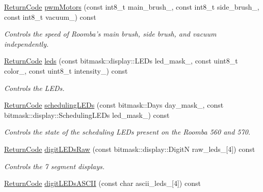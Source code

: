 \begin{DoxyCompactItemize}
\hyperlink{classroomba_1_1series500_1_1oi_1_1_o_i_command_ab408b9562318caf292794d8ba335d5ed}{Return\+Code} \hyperlink{classroomba_1_1series500_1_1oi_1_1_o_i_command_a9f71e1b016dd937a558642aee06933d1}{pwm\+Motors} (const int8\+\_\+t main\+\_\+brush\+\_\+, const int8\+\_\+t side\+\_\+brush\+\_\+, const int8\+\_\+t vacuum\+\_\+) const 
\begin{DoxyCompactList}\small\item\em Controls the speed of Roomba’s main brush, side brush, and vacuum independently. \end{DoxyCompactList}\item 
\hyperlink{classroomba_1_1series500_1_1oi_1_1_o_i_command_ab408b9562318caf292794d8ba335d5ed}{Return\+Code} \hyperlink{classroomba_1_1series500_1_1oi_1_1_o_i_command_a925fb461c5eed347ed509fc8b203628f}{leds} (const bitmask\+::display\+::\+L\+E\+Ds led\+\_\+mask\+\_\+, const uint8\+\_\+t color\+\_\+, const uint8\+\_\+t intensity\+\_\+) const 
\begin{DoxyCompactList}\small\item\em Controls the L\+E\+Ds. \end{DoxyCompactList}\item 
\hyperlink{classroomba_1_1series500_1_1oi_1_1_o_i_command_ab408b9562318caf292794d8ba335d5ed}{Return\+Code} \hyperlink{classroomba_1_1series500_1_1oi_1_1_o_i_command_acc8e8bb3401d6cc425822cc3a840ec6f}{scheduling\+L\+E\+Ds} (const bitmask\+::\+Days day\+\_\+mask\+\_\+, const bitmask\+::display\+::\+Scheduling\+L\+E\+Ds led\+\_\+mask\+\_\+) const 
\begin{DoxyCompactList}\small\item\em Controls the state of the scheduling L\+E\+Ds present on the Roomba 560 and 570. \end{DoxyCompactList}\item 
\hyperlink{classroomba_1_1series500_1_1oi_1_1_o_i_command_ab408b9562318caf292794d8ba335d5ed}{Return\+Code} \hyperlink{classroomba_1_1series500_1_1oi_1_1_o_i_command_ab2a6e0e164906256c4750b7f133b7dd7}{digit\+L\+E\+Ds\+Raw} (const bitmask\+::display\+::\+Digit\+N raw\+\_\+leds\+\_\+\mbox{[}4\mbox{]}) const 
\begin{DoxyCompactList}\small\item\em Controls the 7 segment displays. \end{DoxyCompactList}\item 
\hyperlink{classroomba_1_1series500_1_1oi_1_1_o_i_command_ab408b9562318caf292794d8ba335d5ed}{Return\+Code} \hyperlink{classroomba_1_1series500_1_1oi_1_1_o_i_command_a68c574a076e30cf0461cc462363a2fad}{digit\+L\+E\+Ds\+A\+S\+C\+I\+I} (const char ascii\+\_\+leds\+\_\+\mbox{[}4\mbox{]}) const 

\end{DoxyCompactItemize}
